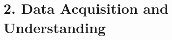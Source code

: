 \documentclass[10pt,compress,t,notes=noshow, xcolor=table]{beamer}
\begin{document}





\section{2. Data Acquisition and Understanding}\label{data-acquisition-and-understanding}
\end{document}
